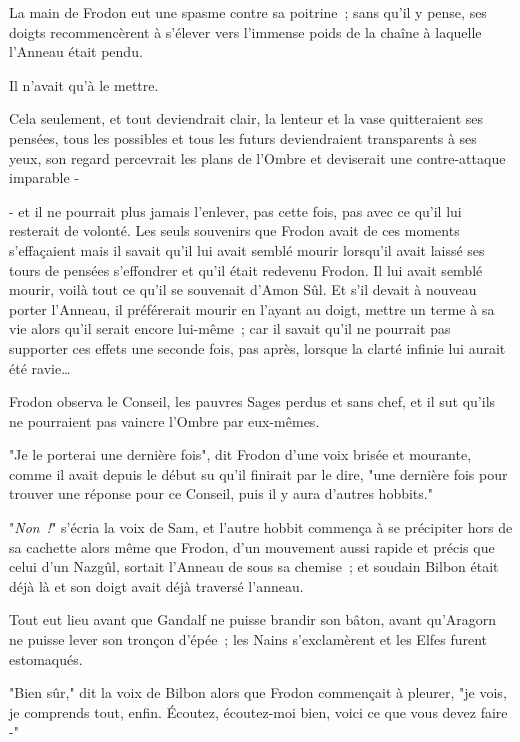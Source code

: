 La main de Frodon eut une spasme contre sa poitrine~; sans qu'il y pense, ses doigts recommencèrent à s'élever vers l'immense poids de la chaîne à laquelle l'Anneau était pendu.

Il n'avait qu'à le mettre.

Cela seulement, et tout deviendrait clair, la lenteur et la vase quitteraient ses pensées, tous les possibles et tous les futurs deviendraient transparents à ses yeux, son regard percevrait les plans de l'Ombre et deviserait une contre-attaque imparable -

- et il ne pourrait plus jamais l'enlever, pas cette fois, pas avec ce qu'il lui resterait de volonté. Les seuls souvenirs que Frodon avait de ces moments s'effaçaient mais il savait qu'il lui avait semblé mourir lorsqu'il avait laissé ses tours de pensées s'effondrer et qu'il était redevenu Frodon. Il lui avait semblé mourir, voilà tout ce qu'il se souvenait d'Amon Sûl. Et s'il devait à nouveau porter l'Anneau, il préférerait mourir en l'ayant au doigt, mettre un terme à sa vie alors qu'il serait encore lui-même~; car il savait qu'il ne pourrait pas supporter ces effets une seconde fois, pas après, lorsque la clarté infinie lui aurait été ravie…

Frodon observa le Conseil, les pauvres Sages perdus et sans chef, et il sut qu'ils ne pourraient pas vaincre l'Ombre par eux-mêmes.

"Je le porterai une dernière fois", dit Frodon d'une voix brisée et mourante, comme il avait depuis le début su qu'il finirait par le dire, "une dernière fois pour trouver une réponse pour ce Conseil, puis il y aura d'autres hobbits."

"\emph{Non~!}" s'écria la voix de Sam, et l'autre hobbit commença à se précipiter hors de sa cachette alors même que Frodon, d'un mouvement aussi rapide et précis que celui d'un Nazgûl, sortait l'Anneau de sous sa chemise~; et soudain Bilbon était déjà là et son doigt avait déjà traversé l'anneau.

Tout eut lieu avant que Gandalf ne puisse brandir son bâton, avant qu'Aragorn ne puisse lever son tronçon d'épée~; les Nains s'exclamèrent et les Elfes furent estomaqués.

"Bien sûr," dit la voix de Bilbon alors que Frodon commençait à pleurer, "je vois, je comprends tout, enfin. Écoutez, écoutez-moi bien, voici ce que vous devez faire -"


